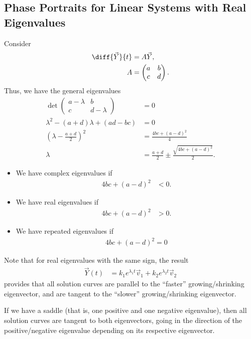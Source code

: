 \documentclass[10pt]{mypackage}
\begin{document}
\subsection{Phase Portraits for Linear Systems with Real Eigenvalues}%
Consider
\begin{align*}
  \diff{\vec{Y}}{t} &= A\vec{Y},\\
  A &= \begin{pmatrix}a & b \\ c & d\end{pmatrix}.
\end{align*}
Thus, we have the general eigenvalues
\begin{align*}
  \det \begin{pmatrix}a-\lambda & b \\ c & d-\lambda\end{pmatrix} &= 0\\
  \lambda^2 - \left(a+d\right)\lambda + \left(ad-bc\right) &= 0\\
  \left(\lambda - \frac{a + d}{2}\right)^2 &= \frac{4bc + \left(a-d\right)^2}{4}\\
  \lambda &= \frac{a+d}{2} \pm \frac{\sqrt{4bc + \left(a-d\right)^2}}{2}.
\end{align*}
\begin{itemize}
  \item We have complex eigenvalues if
\begin{align*}
  4bc + \left(a-d\right)^2 &< 0.
\end{align*}
\item  We have real eigenvalues if
\begin{align*}
  4bc + \left(a-d\right)^2 & > 0.
\end{align*}
\item We have repeated eigenvalues if
  \begin{align*}
    4bc + \left(a-d\right)^2 = 0
  \end{align*}
\end{itemize}
Note that for real eigenvalues with the same sign, the result
\begin{align*}
  \vec{Y}(t) &= k_1e^{\lambda_1 t}\vec{v}_1 + k_2e^{\lambda_2 t}\vec{v}_2
\end{align*}
provides that all solution curves are parallel to the ``faster'' growing/shrinking eigenvector, and are tangent to the ``slower'' growing/shrinking eigenvector.\newline

If we have a saddle (that is, one positive and one negative eigenvalue), then all solution curves are tangent to both eigenvectors, going in the direction of the positive/negative eigenvalue depending on its respective eigenvector.
\end{document}
